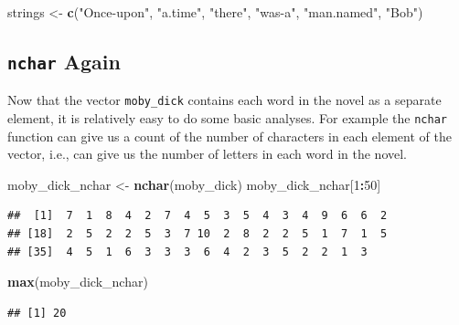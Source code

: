 \documentclass[
]{krantz}
\newenvironment{Shaded}{\begin{snugshade}}{\end{snugshade}}
\newcommand{\DecValTok}[1]{\textcolor[rgb]{0.00,0.00,0.81}{#1}}
\newcommand{\KeywordTok}[1]{\textcolor[rgb]{0.13,0.29,0.53}{\textbf{#1}}}
\newcommand{\NormalTok}[1]{#1}
\newcommand{\OperatorTok}[1]{\textcolor[rgb]{0.81,0.36,0.00}{\textbf{#1}}}
\newcommand{\StringTok}[1]{\textcolor[rgb]{0.31,0.60,0.02}{#1}}
\begin{document}
\begin{Shaded}
\begin{Highlighting}[]
\NormalTok{strings \textless{}{-}}\StringTok{ }\KeywordTok{c}\NormalTok{(}\StringTok{"Once{-}upon"}\NormalTok{, }\StringTok{"a.time"}\NormalTok{, }\StringTok{"there"}\NormalTok{, }\StringTok{"was{-}a"}\NormalTok{, }\StringTok{"man.named"}\NormalTok{, }\StringTok{"Bob"}\NormalTok{)}
\end{Highlighting}
\end{Shaded}

\hypertarget{nchar-again}{%
\subsection{\texorpdfstring{\texttt{nchar} Again}{nchar Again}}\label{nchar-again}}

Now that the vector \texttt{moby\_dick} contains each word in the novel as a separate element, it is relatively easy to do some basic analyses. For example the \texttt{nchar} function can give us a count of the number of characters in each element of the vector, i.e., can give us the number of letters in each word in the novel.

\begin{Shaded}
\begin{Highlighting}[]
\NormalTok{moby\_dick\_nchar \textless{}{-}}\StringTok{ }\KeywordTok{nchar}\NormalTok{(moby\_dick)}
\NormalTok{moby\_dick\_nchar[}\DecValTok{1}\OperatorTok{:}\DecValTok{50}\NormalTok{]}
\end{Highlighting}
\end{Shaded}

\begin{verbatim}
##  [1]  7  1  8  4  2  7  4  5  3  5  4  3  4  9  6  6  2
## [18]  2  5  2  2  5  3  7 10  2  8  2  2  5  1  7  1  5
## [35]  4  5  1  6  3  3  3  6  4  2  3  5  2  2  1  3
\end{verbatim}

\begin{Shaded}
\begin{Highlighting}[]
\KeywordTok{max}\NormalTok{(moby\_dick\_nchar)}
\end{Highlighting}
\end{Shaded}

\begin{verbatim}
## [1] 20
\end{verbatim}
\end{document}
